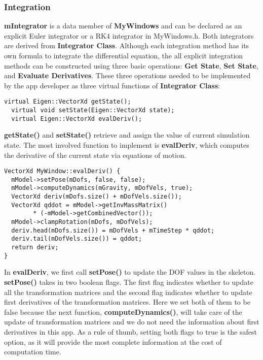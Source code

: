 \subsubsection{Integration}
\textbf{mIntegrator} is a data member of \textbf{MyWindows} and can be
declared as an explicit Euler integrator or a RK4 integrator in
MyWindows.h. Both integrators are derived from \textbf{Integrator
  Class}. Although each integration method has its own formula to
integrate the differential equation, the all explicit integration
methods can be constructed using three basic operations: \textbf{Get
  State}, \textbf{Set State}, and \textbf{Evaluate Derivatives}. These
three operations needed to be implemented by the app developer as
three virtual functions of \textbf{Integrator Class}:

\ttfamily
\begin{lstlisting}[caption=MyWindow.h]
  virtual Eigen::VectorXd getState();
  virtual void setState(Eigen::VectorXd state);	
  virtual Eigen::VectorXd evalDeriv();
\end{lstlisting}
\rmfamily 

\textbf{getState()} and \textbf{setState()} retrieve and
assign the value of current simulation state. The most involved
function to implement is \textbf{evalDeriv}, which computes the
derivative of the current state via equations of motion.

\ttfamily
\begin{lstlisting}[caption=MyWindows.cpp]
VectorXd MyWindow::evalDeriv() {
  mModel->setPose(mDofs, false, false);
  mModel->computeDynamics(mGravity, mDofVels, true);
  VectorXd deriv(mDofs.size() + mDofVels.size());
  VectorXd qddot = mModel->getInvMassMatrix() 
        * (-mModel->getCombinedVector());
  mModel->clampRotation(mDofs, mDofVels);
  deriv.head(mDofs.size()) = mDofVels + mTimeStep * qddot;
  deriv.tail(mDofVels.size()) = qddot;
  return deriv;
}
\end{lstlisting}
\rmfamily
In \textbf{evalDeriv}, we first call \textbf{setPose()} to update the
DOF values in the skeleton. \textbf{setPose()} takes in two boolean
flags. The first flag indicates whether to update all the
transformation matrices and the second flag indicates whether to
update first derivatives of the transformation matrices. Here we set
both of them to be false because the next function, 
\textbf{computeDynamics()}, will take care of the update of
transformation matrices and we do not need the information about first
derivatives in this app. As a rule of thumb, setting both flags to
true is the safest option, as it will provide the most complete
information at the cost of computation time.

